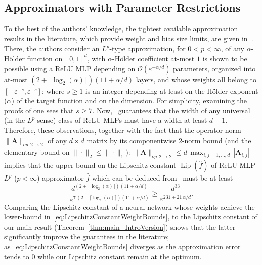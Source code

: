 \documentclass{article}
\numberwithin{equation}{section}
\theoremstyle{definition}
\begin{document}
\subsection{Approximators with Parameter Restrictions}
\label{s:Related__ss:Related__WeightBounds}
To the best of the authors' knowledge, the tightest available approximation results in the literature, which provide weight and bias size limits, are given in~\cite [Theorem 3.1]{petersen2018optimal}.  There, the authors consider an $L^p$-type approximation, for $0<p<\infty$, of any $\alpha$-H\"{o}lder function on $[0,1]^d$, with $\alpha$-H\"{o}lder coefficient at-most $1$ is shown to be possible using a ReLU MLP depending on $\mathcal{O}(\varepsilon^{-\alpha/d})$ parameters, organized into at-most $(2 + \lceil \log_2(\alpha) \rceil ) (11+\alpha/d)$ layers, and whose weights all belong to $[-\varepsilon^{-s},\varepsilon^{-s}]$; where $s\ge 1$ is an integer depending at-least on the H\"{o}lder exponent ($\alpha$) of the target function and on the dimension.  For simplicity, examining the proofs of \citep[Lemmata A.3]{petersen2018optimal} one sees that $s\ge 7$.  Now,~\citep[Theorem 1]{park2021minimum} guarantees that the width of any universal (in the $L^p$ sense) class of ReLU MLPs must have a width at least $d+1$.  Therefore, these observations, together with the fact that the operator norm $\|\mathbf{A}\|_{op:2\to 2}$ of any $d\times d$ matrix by its componentwise $2$-norm bound (and the elementary bound on $\|\cdot\|_2\le \|\cdot\|_1$): $\|\mathbf{A}\|_{op:2\to 2}\le d \, \max_{i,j=1,\dots,d}\,|\mathbf{A}_{i,j}|$ implies that the upper-bound on the Lipschitz constant $\operatorname{Lip}(\hat{f})$ of ReLU MLP $L^p$ ($p<\infty$) approximator $\hat{f}$ which can be deduced from~\citep[Theorem 3.1]{petersen2018optimal} must be at least
\begin{equation}
\label{eq:LipschitzConstantWeightBounds}
    \frac{
        d^{(2 + \lceil \log_2(\alpha) \rceil ) (11+\alpha/d)}
    }{
        \varepsilon^{7\, 
            (2 + \lceil \log_2(\alpha) \rceil ) (11+\alpha/d)
        }
    }
\ge 
    \frac{
        d^{33}
    }{
        \varepsilon^{231 + 21\,\alpha/d}
    }
.
\end{equation}
Comparing the Lipschitz constant of a neural network whose weights achieve the lower-bound in~\eqref{eq:LipschitzConstantWeightBounds}, to the Lipschitz constant of our main result (Theorem~\ref{thm:main_IntroVersion}) shows that the latter significantly improve the guarantees in the literature; as~\eqref{eq:LipschitzConstantWeightBounds} diverges as the approximation error tends to $0$ while our Lipschitz constant remain at the optimum.  
\end{document}
